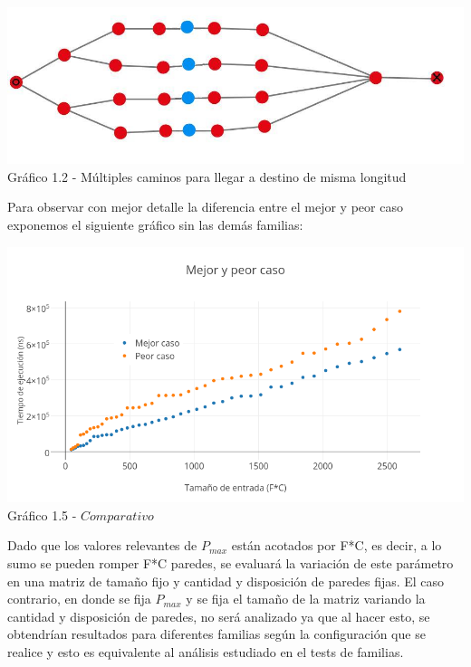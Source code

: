 \vspace*{0.3cm} \vspace*{0.3cm}
  \begin{center}
\includegraphics[scale=0.7]{./EJ1/ej1grafopeorcaso.jpeg}
{Gr\'afico 1.2 - Múltiples caminos para llegar a destino de misma longitud}
  \end{center}
  \vspace*{0.3cm}

Para observar con mejor detalle la diferencia entre el mejor y peor caso exponemos el siguiente gráfico sin las demás familias:

  \vspace*{0.3cm} \vspace*{0.3cm}
  \begin{center}
\includegraphics[scale=0.65]{./EJ1/MejorYPeorCaso.png}
{Gr\'afico 1.5 - $Comparativo$}
  \end{center}
  \vspace*{0.3cm}

Dado que los valores relevantes de $P_{max}$ están acotados por F*C, es decir, a lo sumo se pueden romper F*C paredes, se evaluará la variación de este parámetro en una matriz de tamaño fijo y cantidad y disposición de paredes fijas.
El caso contrario, en donde se fija $P_{max}$ y se fija el tamaño de la matriz variando la cantidad y disposición de paredes, no será analizado ya que al hacer esto, se obtendrían resultados para diferentes familias según la configuración que se realice y esto 
es equivalente al análisis estudiado en el tests de familias.

